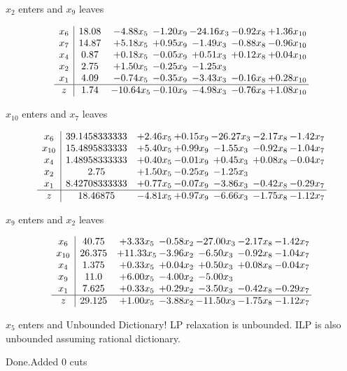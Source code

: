 \documentclass[8pt]{article}
\begin{document}
 $ x_{2} $ enters and $ x_{9} $ leaves 

 \[\begin{array}{c| c c@{\hskip 2pt} c@{\hskip 2pt} c@{\hskip 2pt} c@{\hskip 2pt} c@{\hskip 2pt} }
 x_{6}   &  18.08 & -4.88 x_{5} & -1.20 x_{9} & -24.16 x_{3} & -0.92 x_{8} & +  1.36 x_{10}\\
 x_{7}   &  14.87 & +  5.18 x_{5} & +  0.95 x_{9} & -1.49 x_{3} & -0.88 x_{8} & -0.96 x_{10}\\
 x_{4}   &  0.87 & +  0.18 x_{5} & -0.05 x_{9} & +  0.51 x_{3} & +  0.12 x_{8} & +  0.04 x_{10}\\
 x_{2}   &  2.75 & +  1.50 x_{5} & -0.25 x_{9} & -1.25 x_{3} &    &   \\
 x_{1}   &  4.09 & -0.74 x_{5} & -0.35 x_{9} & -3.43 x_{3} & -0.16 x_{8} & +  0.28 x_{10}\\
\hline
z    &  1.74 & -10.64 x_{5} & -0.10 x_{9} & -4.98 x_{3} & -0.76 x_{8} & +  1.08 x_{10}\\
\end{array}\]


 $ x_{10} $ enters and $ x_{7} $ leaves 

 \[\begin{array}{c| c c@{\hskip 2pt} c@{\hskip 2pt} c@{\hskip 2pt} c@{\hskip 2pt} c@{\hskip 2pt} }
 x_{6}   &  39.1458333333 & +  2.46 x_{5} & +  0.15 x_{9} & -26.27 x_{3} & -2.17 x_{8} & -1.42 x_{7}\\
 x_{10}   &  15.4895833333 & +  5.40 x_{5} & +  0.99 x_{9} & -1.55 x_{3} & -0.92 x_{8} & -1.04 x_{7}\\
 x_{4}   &  1.48958333333 & +  0.40 x_{5} & -0.01 x_{9} & +  0.45 x_{3} & +  0.08 x_{8} & -0.04 x_{7}\\
 x_{2}   &  2.75 & +  1.50 x_{5} & -0.25 x_{9} & -1.25 x_{3} &    &   \\
 x_{1}   &  8.42708333333 & +  0.77 x_{5} & -0.07 x_{9} & -3.86 x_{3} & -0.42 x_{8} & -0.29 x_{7}\\
\hline
z    &  18.46875 & -4.81 x_{5} & +  0.97 x_{9} & -6.66 x_{3} & -1.75 x_{8} & -1.12 x_{7}\\
\end{array}\]


 $ x_{9} $ enters and $ x_{2} $ leaves 

 \[\begin{array}{c| c c@{\hskip 2pt} c@{\hskip 2pt} c@{\hskip 2pt} c@{\hskip 2pt} c@{\hskip 2pt} }
 x_{6}   &  40.75 & +  3.33 x_{5} & -0.58 x_{2} & -27.00 x_{3} & -2.17 x_{8} & -1.42 x_{7}\\
 x_{10}   &  26.375 & + 11.33 x_{5} & -3.96 x_{2} & -6.50 x_{3} & -0.92 x_{8} & -1.04 x_{7}\\
 x_{4}   &  1.375 & +  0.33 x_{5} & +  0.04 x_{2} & +  0.50 x_{3} & +  0.08 x_{8} & -0.04 x_{7}\\
 x_{9}   &  11.0 & +  6.00 x_{5} & -4.00 x_{2} & -5.00 x_{3} &    &   \\
 x_{1}   &  7.625 & +  0.33 x_{5} & +  0.29 x_{2} & -3.50 x_{3} & -0.42 x_{8} & -0.29 x_{7}\\
\hline
z    &  29.125 & +  1.00 x_{5} & -3.88 x_{2} & -11.50 x_{3} & -1.75 x_{8} & -1.12 x_{7}\\
\end{array}\]


 $ x_{5} $ enters and Unbounded Dictionary!
 LP relaxation is unbounded. ILP is also unbounded assuming rational dictionary. 

Done.Added 0 cuts 
\end{document}
